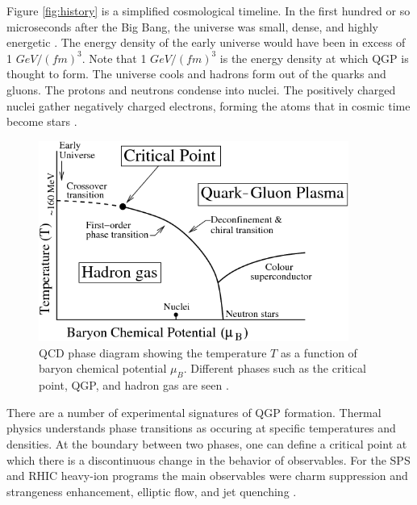 Figure \ref{fig:history} is a simplified cosmological timeline. In the first hundred or so microseconds after the Big Bang, the universe was small, dense, and highly energetic \cite{Bandyopadhyay:2017wip}. The energy density of the early universe would have been in excess of 1 $GeV/(fm)^3$. Note that 1 $GeV/(fm)^3$ is the energy density at which QGP is thought to form. The universe cools and hadrons form out of the quarks and gluons. The protons and neutrons condense into nuclei. The positively charged nuclei gather negatively charged electrons, forming the atoms that in cosmic time become stars \cite{Witten:1984rs}.

\begin{figure}[h!]
\begin{centering}
\includegraphics[width=4in]{Chapter1/importfigs/byr13.png}
\par\end{centering}
\caption{QCD phase diagram showing the temperature $T$ as a function of baryon chemical potential $\mu_B$. Different phases such as the critical point, QGP, and hadron gas are seen \cite{Bhalerao:1695331}. \label{fig:QCDPhase}}
\end{figure}

There are a number of experimental signatures of QGP formation. Thermal physics understands phase transitions as occuring at specific temperatures and densities. At the boundary between two phases, one can define a critical point at which there is a discontinuous change in the behavior of observables. For the SPS and RHIC heavy-ion programs the main observables were charm suppression and strangeness enhancement, elliptic flow, and jet quenching \cite{Gyulassy:1990ye}\cite{Matsui:1986dk}\cite{Margetis:2000sv}.

